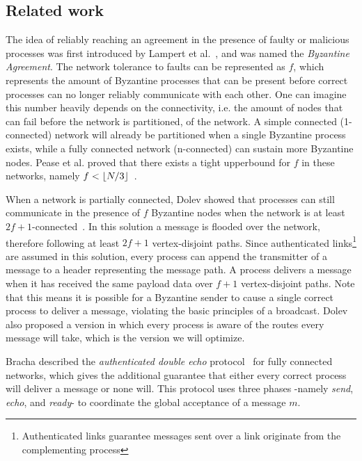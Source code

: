\subsection*{Related work}
The idea of reliably reaching an agreement in the presence of faulty or malicious processes was first introduced by Lampert  et al.~\cite{lamport2019byzantine}, and was named the \textit{Byzantine Agreement}. The network tolerance to faults can be represented as $f$, which represents the amount of Byzantine processes that can be present before correct processes can no longer reliably communicate with each other. One can imagine this number heavily depends on the connectivity, i.e.  the amount of nodes that can fail before the network is partitioned, of the network. A simple connected (1-connected) network will already be partitioned when a single Byzantine process exists, while a fully connected network (n-connected) can sustain more Byzantine nodes. Pease et al. proved that there exists a tight upperbound for $f$ in these networks, namely $f < \lfloor N/3\rfloor$~\cite{pease1980reaching}.

When a network is partially connected, Dolev showed that processes can still communicate  in the presence of $f$ Byzantine nodes when the network is at least $2f+1$-connected~\cite{dolev}. In this solution a message is flooded over the network, therefore following at least $2f+1$ vertex-disjoint paths.  Since authenticated links\footnote{Authenticated links guarantee messages sent over a link originate from the complementing process} are assumed in this solution, every process can append the transmitter of a message to a header representing the message path. A process delivers a message when it has received the same payload data over $f+1$ vertex-disjoint paths. Note that this means it is possible for a Byzantine sender to cause a single correct process to deliver a message, violating the basic principles of a broadcast. Dolev also proposed a version in which every process is aware of the routes every message will take, which is the version we will optimize.

Bracha described the \textit{authenticated double echo} protocol~\cite{bracha} for fully connected networks, which gives the additional guarantee that either every correct process will deliver a message or none will. This protocol uses three phases -namely \textit{send}, \textit{echo}, and \textit{ready}- to coordinate the global acceptance of a message $m$.


